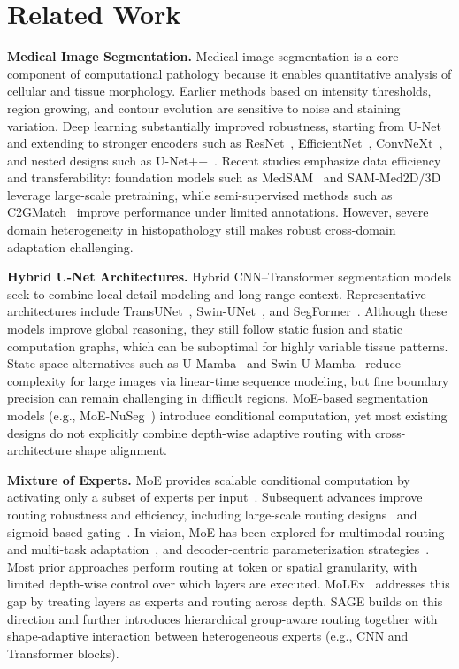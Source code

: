 \section{Related Work}
\label{sec:related_work}

\textbf{Medical Image Segmentation.}
Medical image segmentation is a core component of computational pathology because it enables quantitative analysis of cellular and tissue morphology. Earlier methods based on intensity thresholds, region growing, and contour evolution are sensitive to noise and staining variation. Deep learning substantially improved robustness, starting from U-Net~\cite{ronneberger2015unet} and extending to stronger encoders such as ResNet~\cite{ResNet}, EfficientNet~\cite{EfficientNetRM}, ConvNeXt~\cite{ConvNext}, and nested designs such as U-Net++~\cite{zhou2018unet++}. Recent studies emphasize data efficiency and transferability: foundation models such as MedSAM~\cite{medSAM} and SAM-Med2D/3D~\cite{sun2024sammed2d} leverage large-scale pretraining, while semi-supervised methods such as C2GMatch~\cite{C2GMatch} improve performance under limited annotations. However, severe domain heterogeneity in histopathology still makes robust cross-domain adaptation challenging.


\noindent\textbf{Hybrid U-Net Architectures.}
Hybrid CNN--Transformer segmentation models seek to combine local detail modeling and long-range context. Representative architectures include TransUNet~\cite{chen2024transunet}, Swin-UNet~\cite{cao2022swin}, and SegFormer~\cite{xie2021segformer}. Although these models improve global reasoning, they still follow static fusion and static computation graphs, which can be suboptimal for highly variable tissue patterns. State-space alternatives such as U-Mamba~\cite{ma2024u} and Swin U-Mamba~\cite{liu2024swin} reduce complexity for large images via linear-time sequence modeling, but fine boundary precision can remain challenging in difficult regions. MoE-based segmentation models (e.g., MoE-NuSeg~\cite{wu2025moe}) introduce conditional computation, yet most existing designs do not explicitly combine depth-wise adaptive routing with cross-architecture shape alignment.


\noindent\textbf{Mixture of Experts.}
MoE provides scalable conditional computation by activating only a subset of experts per input~\cite{sparseMoE}. Subsequent advances improve routing robustness and efficiency, including large-scale routing designs~\cite{deepseekMoE} and sigmoid-based gating~\cite{sigmoidGatingMoE, sigmoid_attention}. In vision, MoE has been explored for multimodal routing and multi-task adaptation~\cite{mixtureCNN, Ada-MV}, and decoder-centric parameterization strategies~\cite{mixture-of-low-rank}. Most prior approaches perform routing at token or spatial granularity, with limited depth-wise control over which layers are executed. MoLEx~\cite{molex} addresses this gap by treating layers as experts and routing across depth. SAGE builds on this direction and further introduces hierarchical group-aware routing together with shape-adaptive interaction between heterogeneous experts (e.g., CNN and Transformer blocks).